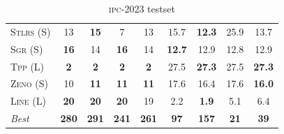 \documentclass[11pt]{article}
\begin{document}
\begin{table}[tb]
{\begin{tabular}{|l||cccc||cccc||}
\textsc{Stlrs} (S)&13&\textbf{15}&7&13&15.7&\textbf{12.3}&25.9&13.7\\
\textsc{Sgr} (S)&\textbf{16}&14&\textbf{16}&14&\textbf{12.7}&12.9&12.8&12.9\\
\textsc{Tpp} (L)&\textbf{2}&\textbf{2}&\textbf{2}&\textbf{2}&27.5&\textbf{27.3}&27.5&\textbf{27.3}\\
\textsc{Zeno} (S)&10&\textbf{11}&\textbf{11}&\textbf{11}&17.6&16.4&17.6&\textbf{16.0}\\
\textsc{Line} (L)&\textbf{20}&\textbf{20}&\textbf{20}&19&2.2&\textbf{1.9}&5.1&6.4
\\\hline
\textit{Best}&\textbf{280}&\textbf{291}&\textbf{241}&\textbf{261}&\textbf{97}&\textbf{157}&\textbf{21}&\textbf{39}\\\hline

        \end{tabular}}
        \caption{\textsc{ipc}-2023 testset}
        \label{tab:ipc}
        \end{table}
        
\end{document}
